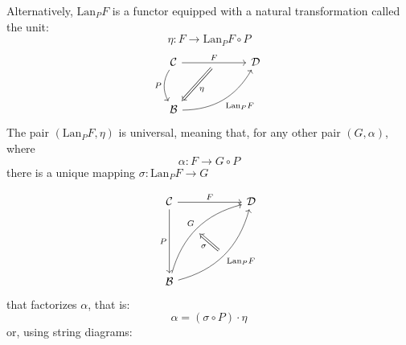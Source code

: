 \documentclass[DaoFP]{subfiles}
\begin{document}
Alternatively, $\text{Lan}_P F$ is a functor equipped with a natural transformation called the unit:
\[ \eta \colon F \to \text{Lan}_P F \circ P \]
\[
 \begin{tikzcd} [row sep=1cm, column sep=1cm]
 \cat C
 \arrow[rr, "F", "" {name=ID, below} ]
 \arrow[d, bend right, "P"']
 && \cat D
 \\
 \cat B
  \arrow[urr, bend right, "\text{Lan}_P F"']
 \arrow[Rightarrow, "\eta",  from=ID]
 \end{tikzcd}
\]
The pair $(\text{Lan}_P F, \eta)$ is universal, meaning that, for any other pair $(G, \alpha)$, where 
\[ \alpha \colon F \to G \circ P\] 
there is a unique mapping $\sigma \colon \text{Lan}_P F \to G$ 

\[
\begin{tikzcd}[row sep=2cm, column sep=2cm]
\cat C  \ar[d, "P"', "" {name=P}]
            \ar[r, "F", ""  {name=F, below, near start, bend right}]
&
\cat D
\\
\cat B
    \ar[ur, bend left, "G", "" {name=G, below}]
    \ar[ur, bend right, "\text{Lan}_P F"', "" {name=Lan}]
\arrow[Rightarrow, "\sigma", from=Lan, to=G]
\end{tikzcd}
\]
that factorizes $\alpha$, that is:
\[ \alpha = (\sigma \circ P) \cdot \eta \]
or, using string diagrams:
\end{document}
